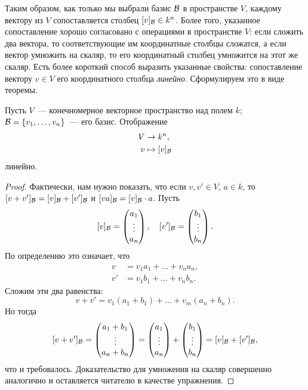 Таким образом, как только мы выбрали базис $\mathcal B$
в пространстве $V$, каждому вектору из $V$
сопоставляется столбец $[v]_{\mathcal B}\in k^n$.
Более того, указанное сопоставление хорошо согласовано
с операциями в пространстве $V$: если сложить два вектора,
то соответствующие им координатные столбцы сложатся,
а если вектор умножить на скаляр, то его координатный столбец
умножится на этот же скаляр.
Есть более короткий способ выразить указанные свойства:
сопоставление вектору $v\in V$ его координатного столбца
{\em линейно}. Сформулируем это в виде теоремы.
\begin{theorem}\label{thm:taking-coordinates-is-linear-map}
Пусть $V$~--- конечномерное векторное пространство над
полем $k$; $\mathcal B = \{v_1,\dots,v_n\}$~--- его базис.
Отображение
\begin{align*}
V & \to k^n,\\
v & \mapsto [v]_{\mathcal B}
\end{align*}
линейно.
\end{theorem}
\begin{proof}
Фактически, нам нужно показать, что если $v,v'\in V$,
$a\in k$, то
$[v+v']_{\mathcal B} = [v]_{\mathcal B} + [v']_{\mathcal B}$
и $[va]_{\mathcal B} = [v]_{\mathcal B} \cdot a$.
Пусть
$$
[v]_{\mathcal B} = \begin{pmatrix}a_1\\\vdots\\a_n\end{pmatrix},
\quad
[v']_{\mathcal B} = \begin{pmatrix}b_1\\\vdots\\b_n\end{pmatrix}.
$$
По определению это означает, что
\begin{align*}
v &= v_1a_1 + \dots + v_na_n,\\
v' &= v_1b_1 + \dots + v_nb_n.
\end{align*}
Сложим эти два равенства:
$$
v+v' = v_1(a_1+b_1) + \dots + v_m(a_n+b_n).
$$
Но тогда
$$
[v+v']_{\mathcal B} = \begin{pmatrix} a_1+b_1 \\
\vdots \\ a_n + b_n \end{pmatrix}
= \begin{pmatrix}a_1\\\vdots\\a_n\end{pmatrix} +
\begin{pmatrix}b_1\\\vdots\\b_n\end{pmatrix}
= [v]_{\mathcal B} + [v']_{\mathcal B},
$$
что и требовалось. Доказательство для умножения на скаляр
совершенно аналогично и оставляется читателю в качестве
упражнения.
\end{proof}

